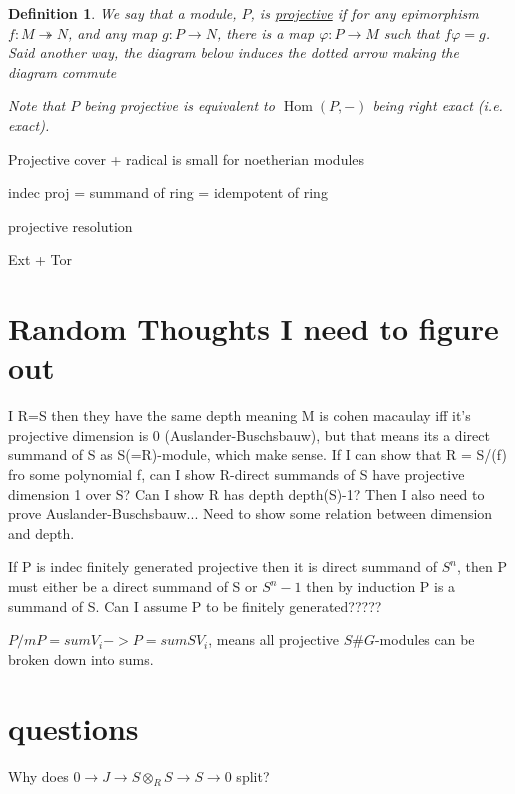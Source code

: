 \documentclass[11pt, a4paper, english]{article}
\numberwithin{prop}{section}
\numberwithin{lemma}{section}
\numberwithin{theorem}{section}
\newtheorem{defin}{Definition}
\numberwithin{defin}{section}
\numberwithin{example}{section}
\DeclareMathOperator{\Hom}{Hom}
\begin{document}
\begin{appendices}
\begin{defin}
We say that a module, $P$, is \underline{projective} if for any epimorphism $f: M \twoheadrightarrow N$, and any map $g: P \to N$, there is a map $\varphi: P \to M$ such that $f \varphi = g$. Said another way, the diagram below induces the dotted arrow making the diagram commute
\begin{center}
\end{center} 
Note that $P$ being projective is equivalent to $\Hom(P, -)$ being right exact (i.e. exact).
\end{defin}

Projective cover + radical is  small for noetherian modules

indec proj = summand of ring = idempotent of ring

projective resolution

Ext + Tor
\end{appendices}

\section{Random Thoughts I need to figure out}
I R=S then they have the same depth meaning M is cohen macaulay iff it's projective dimension is 0 (Auslander-Buschsbauw), but that means its a direct summand of S as S(=R)-module, which make sense. If I can show that R = S/(f) fro some polynomial f, can I show R-direct summands of S have projective dimension 1 over S? Can I show R has depth depth(S)-1? Then I also need to prove Auslander-Buschsbauw... Need to show some relation between dimension and depth.

If P is indec finitely generated projective then it is direct summand of $S^n$, then P must either be a direct summand of S or $S^n-1$ then by induction P is a  summand of S. Can I assume P to be finitely generated?????

$P/mP = sum V_i -> P = sum SV_i$, means  all projective $S\#G$-modules can be broken down into sums.

\section{questions}
Why does $0 \to J \to S \otimes_R S \to S \to 0$ split?
\end{document}
